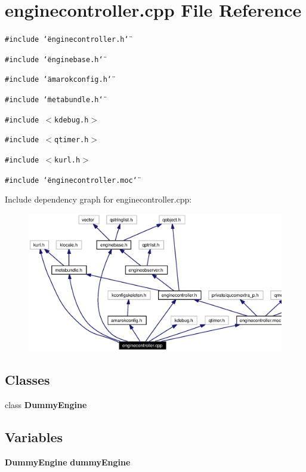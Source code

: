 \section{enginecontroller.cpp File Reference}
\label{enginecontroller_8cpp}


{\tt \#include \char`\"{}enginecontroller.h\char`\"{}}\par
{\tt \#include \char`\"{}enginebase.h\char`\"{}}\par
{\tt \#include \char`\"{}amarokconfig.h\char`\"{}}\par
{\tt \#include \char`\"{}metabundle.h\char`\"{}}\par
{\tt \#include $<$kdebug.h$>$}\par
{\tt \#include $<$qtimer.h$>$}\par
{\tt \#include $<$kurl.h$>$}\par
{\tt \#include \char`\"{}enginecontroller.moc\char`\"{}}\par


Include dependency graph for enginecontroller.cpp:\begin{figure}[H]
\begin{center}
\leavevmode
\includegraphics[width=374pt]{enginecontroller_8cpp__incl}
\end{center}
\end{figure}
\subsection*{Classes}
\begin{CompactItemize}
\item 
class {\bf Dummy\-Engine}
\end{CompactItemize}
\subsection*{Variables}
\begin{CompactItemize}
\item 
{\bf Dummy\-Engine} {\bf dummy\-Engine}
\end{CompactItemize}


